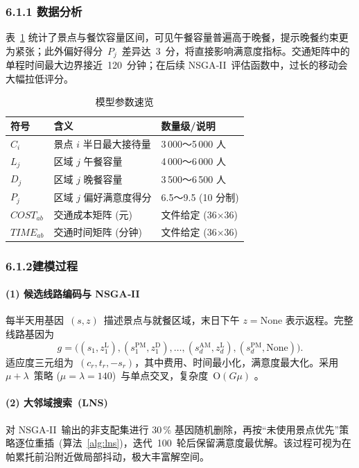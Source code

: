 \documentclass[12pt,a4paper]{article}
\newcommand{\bigO}{\mathrm{O}}
\begin{document}
\subsubsection*{6.1.1 数据分析}
表 \ref{tab:data} 统计了景点与餐饮容量区间，可见午餐容量普遍高于晚餐，提示晚餐约束更为紧张；此外偏好得分 $P_j$ 差异达 3 分，将直接影响满意度指标。交通矩阵中的单程时间最大边界接近 120 分钟；在后续 NSGA‑II 评估函数中，过长的移动会大幅拉低评分。
\begin{table}[H]
\centering\small
\caption{模型参数速览}\label{tab:data}
\begin{tabular}{lll}
\toprule
符号 & 含义 & 数量级/说明 \\ \midrule
$C_i$ & 景点 $i$ 半日最大接待量            & 3\,000～5\,000 人 \\
$L_j$ & 区域 $j$ 午餐容量                 & 4\,000～6\,000 人 \\
$D_j$ & 区域 $j$ 晚餐容量                 & 3\,500～6\,500 人 \\
$P_j$ & 区域 $j$ 偏好满意度得分           & 6.5～9.5 (10 分制) \\
$COST_{ab}$ & 交通成本矩阵 (元)           & 文件给定 (36×36) \\
$TIME_{ab}$ & 交通时间矩阵 (分钟)         & 文件给定 (36×36) \\
\bottomrule
\end{tabular}
\end{table}
\subsubsection*{6.1.2\quad 建模过程}

\paragraph{(1) 候选线路编码与 NSGA‑II}
每半天用基因 $(s,z)$ 描述景点与就餐区域，末日下午 $z=\text{None}$ 表示返程。完整线路基因为
\[
g=\bigl( (s_1,z_1^{\mathrm{L}}),(s_1^{\mathrm{PM}},z_1^{\mathrm{D}}),\dots,(s_d^{\mathrm{AM}},z_d^{\mathrm{L}}),(s_d^{\mathrm{PM}},\text{None}) \bigr).
\]
适应度三元组为 $(c_r,t_r,-s_r)$，其中费用、时间最小化，满意度最大化。采用 $\mu+\lambda$ 策略 ($\mu=\lambda=140$) 与单点交叉，复杂度 $\bigO(G\mu)$ \cite{陈2006基于}。

\paragraph{(2) 大邻域搜索 (LNS)}
对 NSGA‑II 输出的非支配集进行 30\,\% 基因随机删除，再按“未使用景点优先”策略逐位重插 (算法 \ref{alg:lns})，迭代 100 轮后保留满意度最优解。该过程可视为在帕累托前沿附近做局部抖动，极大丰富解空间。
\end{document}
